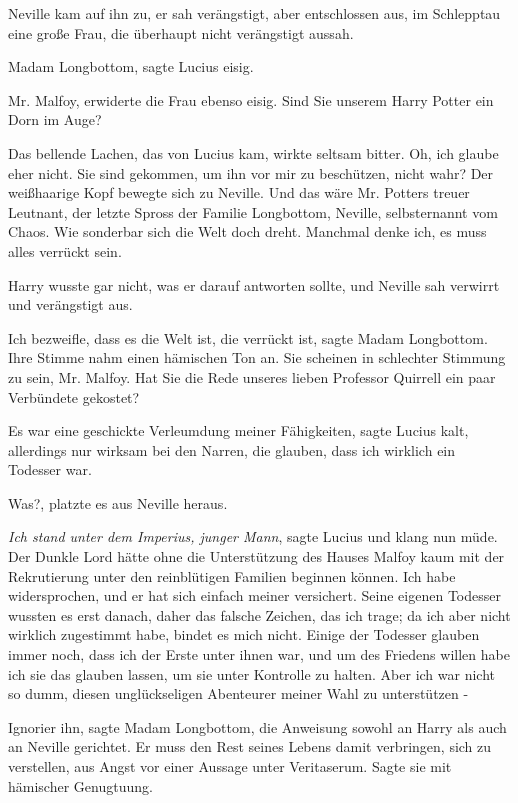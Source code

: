 Neville kam auf ihn zu, er sah verängstigt, aber entschlossen aus, im Schlepptau
eine große Frau, die überhaupt nicht verängstigt aussah.

\glqq{}Madam Longbottom\grqq{}, sagte Lucius eisig.

\glqq{}Mr. Malfoy\grqq{}, erwiderte die Frau ebenso eisig. \glqq{}Sind Sie
unserem Harry Potter ein Dorn im Auge?\grqq{}

Das bellende Lachen, das von Lucius kam, wirkte seltsam bitter. \glqq{}Oh, ich
glaube eher nicht. Sie sind gekommen, um ihn vor mir zu beschützen, nicht wahr?\grqq{}
Der weißhaarige Kopf bewegte sich zu Neville. \glqq{}Und das wäre Mr. Potters
treuer Leutnant, der letzte Spross der Familie Longbottom, Neville,
selbsternannt vom Chaos. Wie sonderbar sich die Welt doch dreht. Manchmal denke
ich, es muss alles verrückt sein.\grqq{}

Harry wusste gar nicht, was er darauf antworten sollte, und Neville sah verwirrt
und verängstigt aus.

\glqq{}Ich bezweifle, dass es die Welt ist, die verrückt ist\grqq{}, sagte Madam
Longbottom. Ihre Stimme nahm einen hämischen Ton an. \glqq{}Sie scheinen in
schlechter Stimmung zu sein, Mr. Malfoy. Hat Sie die Rede unseres lieben
Professor Quirrell ein paar Verbündete gekostet?\grqq{}

\glqq{}Es war eine geschickte Verleumdung meiner Fähigkeiten\grqq{}, sagte
Lucius kalt, \glqq{}allerdings nur wirksam bei den Narren, die glauben, dass ich
wirklich ein Todesser war.\grqq{}

\glqq{}Was?\grqq{}, platzte es aus Neville heraus.

\glqq{}\emph{Ich stand unter dem Imperius, junger Mann}\grqq{}, sagte Lucius und
klang nun müde. \glqq{}Der Dunkle Lord hätte ohne die Unterstützung des Hauses
Malfoy kaum mit der Rekrutierung unter den reinblütigen Familien beginnen
können. Ich habe widersprochen, und er hat sich einfach meiner versichert. Seine
eigenen Todesser wussten es erst danach, daher das falsche Zeichen, das ich
trage; da ich aber nicht wirklich zugestimmt habe, bindet es mich nicht. Einige
der Todesser glauben immer noch, dass ich der Erste unter ihnen war, und um des
Friedens willen habe ich sie das glauben lassen, um sie unter Kontrolle zu
halten. Aber ich war nicht so dumm, diesen unglückseligen Abenteurer meiner Wahl
zu unterstützen -\grqq{}

\glqq{}Ignorier ihn\grqq{}, sagte Madam Longbottom, die Anweisung sowohl an
Harry als auch an Neville gerichtet. \glqq{}Er muss den Rest seines Lebens damit
verbringen, sich zu verstellen, aus Angst vor einer Aussage unter
Veritaserum.\grqq{} Sagte sie mit hämischer Genugtuung.

